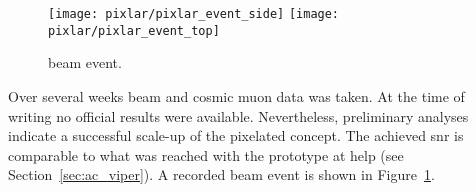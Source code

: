 \begin{figure}[tbp]
	\centering
	\texttt{[image: pixlar/pixlar\_event\_side]}
	\texttt{[image: pixlar/pixlar\_event\_top]}
	\caption[\pixlar{} beam event]{%
		\pixlar{} beam event.
	}
	\label{fig:pixlar_event}
\end{figure}

Over several weeks beam and cosmic muon data was taken.
At the time of writing no official results were available.
Nevertheless, preliminary analyses indicate a successful scale-up of the pixelated \lartpc{} concept.
The achieved \gls{snr} is comparable to what was reached with the prototype at \gls{help} (see Section~\ref{sec:ac_viper}).
A recorded beam event is shown in Figure~\ref{fig:pixlar_event}.